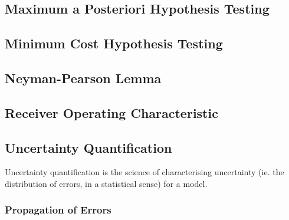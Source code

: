 \documentclass[11pt]{report} %
\begin{document}
\subsection{Maximum a Posteriori Hypothesis Testing}

\subsection{Minimum Cost Hypothesis Testing}

\subsection{Neyman-Pearson Lemma}

\subsection{Receiver Operating Characteristic}

\subsection{Uncertainty Quantification}

Uncertainty quantification is the science of characterising uncertainty (ie. the distribution of errors, in a statistical sense) for a model.

\subsubsection{Propagation of Errors}
\end{document}
